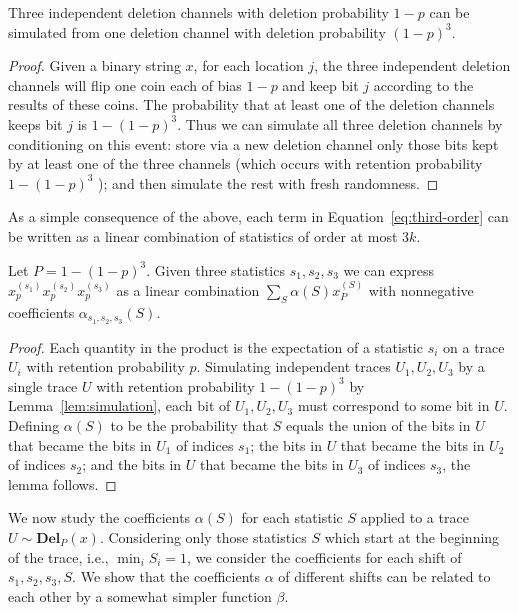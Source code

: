 \documentclass[11pt]{article}
\theoremstyle{plain}
\newcommand{\Del}[2]{\textbf{Del}_{#1}(#2)}
\begin{document}
\begin{lemma}
    \label{lem:simulation}
    Three independent deletion channels with deletion probability $1-p$ can be simulated from one deletion channel with deletion probability $(1-p)^3$.
\end{lemma}
\begin{proof}
    Given a binary string $x$, for each location $j$, the three independent deletion channels will flip one coin each of bias $1-p$ and keep bit $j$ according to the results of these coins. The probability that at least one of the deletion channels keeps bit $j$ is $1-(1-p)^3$. Thus we can simulate all three deletion channels by conditioning on this event: store via a new deletion channel only those bits kept by at least one of the three channels (which occurs with retention probability $1-(1-p)^3$ ); and then simulate the rest with fresh randomness.  
\end{proof}



As a simple consequence of the above, each term in Equation~\ref{eq:third-order} can be written as a linear combination of statistics of order at most $3k$. 

\begin{lemma}\label{lem:alpha}
Let $P=1-(1-p)^3$. Given three statistics $s_1,s_2,s_3$ we can express $x_p^{(s_1)}x_p^{(s_2)}x_p^{(s_3)}$ as a linear combination $\sum_S \alpha(S) x_P^{(S)}$ with nonnegative coefficients $\alpha_{s_1,s_2,s_3}(S)$.
\end{lemma}
\begin{proof}
    Each quantity in the product is the expectation of a statistic $s_i$ on a trace $U_i$ with retention probability $p$. Simulating independent traces $U_1,U_2,U_3$ by a single trace $U$ with retention probability $1-(1-p)^3$ by Lemma~\ref{lem:simulation}, each bit of $U_1,U_2,U_3$ must correspond to some bit in $U$. Defining $\alpha(S)$ to be the probability that $S$ equals the union of the bits in $U$ that became the bits in $U_1$ of indices $s_1$; the bits in $U$ that became the bits in $U_2$ of indices $s_2$; and the bits in $U$ that became the bits in $U_3$ of indices $s_3$, the lemma follows.
\end{proof}



We now study the coefficients $\alpha(S)$ for each statistic $S$ applied to a trace $U \sim \Del{P}{x}$. Considering only those statistics $S$ which start at the beginning of the trace, i.e., $\min_i S_i = 1$, we consider the coefficients for each shift of $s_1,s_2,s_3,S$. We show that the coefficients $\alpha$ of different shifts can be related to each other by a somewhat simpler function $\beta$. 
\end{document}
